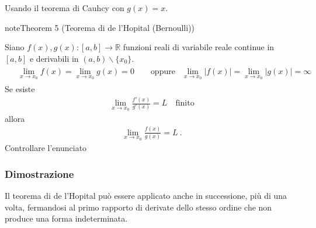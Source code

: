 \documentclass[letterpaper,10pt,english]{jupyterBook}
\begin{document}
\sphinxAtStartPar
{} Usando il teorema di Cauhcy con \(g(x) = x\).
\label{ch/infinitesimal_calculus/derivatives:theorem-4}
\begin{sphinxadmonition}{note}{Theorem 5 (Teorema di de l’Hopital (Bernoulli))}



\sphinxAtStartPar
Siano \(f(x), g(x): [a,b] \rightarrow \mathbb{R}\) funzioni reali di variabile reale continue in \([a,b]\) e derivabili in \((a,b) \backslash \{ x_0 \}\).
\begin{equation*}
\begin{split}\begin{aligned}
  & \lim_{x \rightarrow x_0} f(x) = \lim_{x \rightarrow x_0} g(x) = 0 \qquad \text{oppure}
  & \lim_{x \rightarrow x_0}|f(x)|= \lim_{x \rightarrow x_0}|g(x)|= \infty
\end{aligned}\end{split}
\end{equation*}
\sphinxAtStartPar
Se esiste
\begin{equation*}
\begin{split} \lim_{x \rightarrow x_0} \frac{f'(x)}{g'(x)} = L \quad \text{finito}\end{split}
\end{equation*}
\sphinxAtStartPar
allora
\begin{equation*}
\begin{split} \lim_{x \rightarrow x_0} \frac{f(x)}{g(x)} = L \ . \end{split}
\end{equation*}
\sphinxAtStartPar
{} Controllare l’enunciato
\end{sphinxadmonition}
\subsubsection*{Dimostrazione}

\sphinxAtStartPar
{}

\sphinxAtStartPar
{} Il teorema di de l’Hopital può essere applicato anche in successione, più di una volta, fermandosi al primo rapporto di derivate dello stesso ordine che non produce una forma indeterminata.
\end{document}
